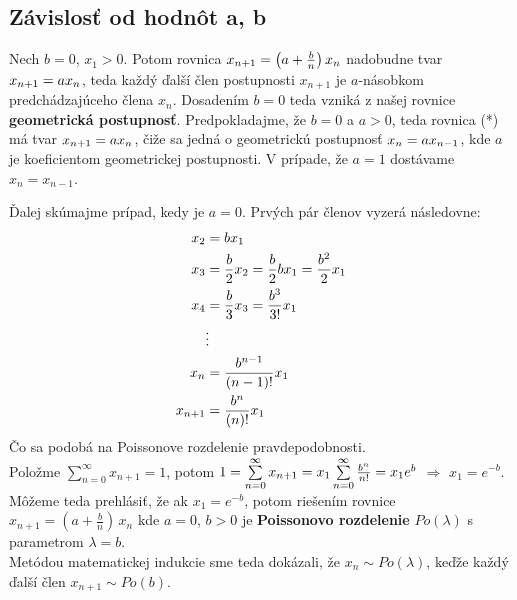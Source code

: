 \documentclass[a4paper,10pt]{article}
\theoremstyle{plain}
\theoremstyle{definition}
\begin{document}
\subsection{Závislosť od hodnôt a, b}
Nech $ b=0 $,  $x_{1}>0$.\newline
Potom rovnica $x_{n+1}=\left(a+{\frac{b}{n}}\right)\*x_{n}$  nadobudne tvar  $x_{n+1}= a\*x_{n}$, 
teda každý ďalší člen postupnosti $x_{n+1}$ je $a$-násobkom predchádzajúceho člena  $x_{n}$.
Dosadením  $b=0$ teda vzniká z našej rovnice \textbf{geometrická postupnosť}.
\newpage
Predpokladajme, že $ b=0 $ a $ a > 0 $, teda rovnica (*) má tvar $ x_{n+1} = a\*x_{n} $, čiže sa jedná o geometrickú postupnosť
$ x_{n} = a\*x_{n-1} $, kde $ a $ je koeficientom geometrickej postupnosti. V prípade, že $ a = 1 $ dostávame $ x_{n} = x_{n-1} $.


Ďalej skúmajme prípad, kedy je $ a=0 $. Prvých pár členov vyzerá následovne: 
\begin{align*}
x_{2}&=b\*x_{1}\\
x_{3}&=\frac{b}{2}\*x_{2} = \frac{b}{2}\*b\*x_{1}=\frac{b^{2}}{2}\*x_{1} \\
x_{4}&=\frac{b}{3}\*x_{3} = \frac{b^{3}}{3!}\*x_{1}  \\
&\vdots \\
x_{n}&=\frac{b^{n-1}}{(n-1)!}\*x_{1}    \\
x_{n+1}&=\frac{b^{n}}{(n)!}\*x_{1}   \\
\end{align*}
Čo sa podobá na Poissonove rozdelenie pravdepodobnosti. \\
Položme $ \sum\limits_{n=0}^\infty x_{n+1} = 1 $, potom $ 1=\sum\limits_{n=0}^\infty x_{n+1} = x_{1}\*\sum\limits_{n=0}^\infty \frac{b^{n}}{n!} = x_{1}\*e^{b}$ $ \Rightarrow $ $ x_{1} = e^{-b} $.
Môžeme teda prehlásiť, že ak $x_{1}=e^{-b} $, potom riešením rovnice\\
$x_{n+1}=\left(a+{\frac{b}{n}}\right)\,x_{n}$ kde $a=0$, $b>0$
je \textbf{Poissonovo rozdelenie} $Po(\lambda)$ s parametrom $\lambda=b$.\\
Metódou matematickej indukcie sme teda dokázali, že $x_{n}\sim Po(\lambda)$, keďže každý ďalší člen $x_{n+1}\sim Po(b)$.\\

\end{document}
